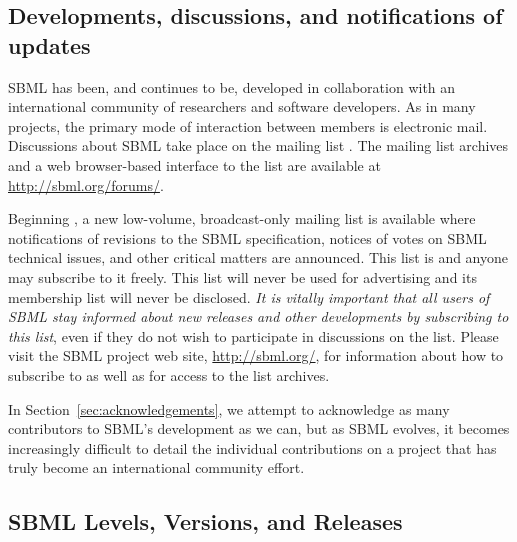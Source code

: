 \subsection{Developments, discussions, and notifications of updates}


SBML has been, and continues to be, developed in collaboration
with an international community of researchers and software
developers.  As in many projects, the primary mode of interaction
between members is electronic mail.  Discussions about SBML take
place on the mailing list
.  The
mailing list archives and a web browser-based interface to the
list are available at \url{http://sbml.org/forums/}.

Beginning , a new low-volume,
broadcast-only mailing list is available where notifications of
revisions to the SBML specification, notices of votes on SBML
technical issues, and other critical matters are announced.  This
list is 
and anyone may subscribe to it freely.  This list will never be
used for advertising and its membership list will never be
disclosed.  \emph{It is vitally important that all users of SBML
  stay informed about new releases and other developments by
  subscribing to this list}, even if they do not wish to
participate in discussions on the
 list.
Please visit the SBML project web site, \url{http://sbml.org/},
for information about how to subscribe to
 as well
as for access to the list archives.

In Section~\ref{sec:acknowledgements}, we attempt to acknowledge
as many contributors to SBML's development as we can, but as SBML
evolves, it becomes increasingly difficult to detail the
individual contributions on a project that has truly become an
international community effort.


\subsection{SBML Levels, Versions, and Releases}
\label{sec:levels-versions-releases}


